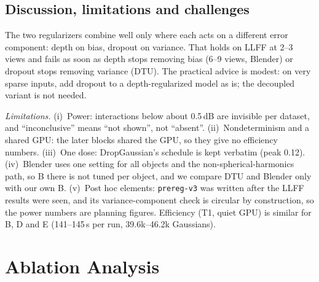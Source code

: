 \documentclass[conference]{IEEEtran}
\newcommand{\dB}{\,dB}
\begin{document}
\subsection{Discussion, limitations and challenges}
The two regularizers combine well only where each acts on a different error component: depth on bias, dropout on variance. That holds on LLFF at 2--3 views and fails as soon as depth stops removing bias (6--9 views, Blender) or dropout stops removing variance (DTU). The practical advice is modest: on very sparse inputs, add dropout to a depth-regularized model as is; the decoupled variant is not needed.

\emph{Limitations.} (i)~Power: interactions below about 0.5\dB{} are invisible per dataset, and ``inconclusive'' means ``not shown'', not ``absent''. (ii)~Nondeterminism and a shared GPU: the later blocks shared the GPU, so they give no efficiency numbers. (iii)~One dose: DropGaussian's schedule is kept verbatim (peak 0.12). (iv)~Blender uses one setting for all objects and the non-spherical-harmonics path, so B there is not tuned per object, and we compare DTU and Blender only with our own B. (v)~Post hoc elements: \texttt{prereg-v3} was written after the LLFF results were seen, and its variance-component check is circular by construction, so the power numbers are planning figures. Efficiency (T1, quiet GPU) is similar for B, D and E (141--145\,s per run, 39.6k--46.2k Gaussians).

\section{Ablation Analysis}\label{sec:ablation}
\end{document}
